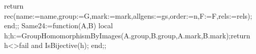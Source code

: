 \documentclass[
  10pt,
  letterpaper,
]{article}
\newenvironment{Shaded}{}{}
\newcommand{\BuiltInTok}[1]{\textcolor[rgb]{0.00,0.50,0.00}{#1}}
\newcommand{\ConstantTok}[1]{\textcolor[rgb]{0.53,0.00,0.00}{#1}}
\newcommand{\ExtensionTok}[1]{#1}
\newcommand{\FunctionTok}[1]{\textcolor[rgb]{0.02,0.16,0.49}{#1}}
\newcommand{\NormalTok}[1]{#1}
\newcommand{\OperatorTok}[1]{\textcolor[rgb]{0.40,0.40,0.40}{#1}}
\newcommand{\VariableTok}[1]{\textcolor[rgb]{0.10,0.09,0.49}{#1}}
\begin{document}
\begin{Shaded}
\begin{Highlighting}[]
 \ExtensionTok{return} \ExtensionTok{rec}\NormalTok{(}\VariableTok{name}\OperatorTok{:=}\VariableTok{name}\OperatorTok{,}\VariableTok{group}\OperatorTok{:=}\VariableTok{G}\OperatorTok{,}\VariableTok{mark}\OperatorTok{:=}\VariableTok{mark}\OperatorTok{,}\VariableTok{allgens}\OperatorTok{:=}\VariableTok{gs}\OperatorTok{,}\VariableTok{order}\OperatorTok{:=}\VariableTok{n}\OperatorTok{,}\VariableTok{F}\OperatorTok{:=}\VariableTok{F}\OperatorTok{,}\VariableTok{rels}\OperatorTok{:=}\VariableTok{rels}\NormalTok{)}\OperatorTok{;}
\FunctionTok{end}\OperatorTok{;;}
\VariableTok{Same24}\OperatorTok{:=}\FunctionTok{function}\NormalTok{(}\VariableTok{A}\OperatorTok{,}\VariableTok{B}\NormalTok{)}
 \ExtensionTok{local} \VariableTok{h}\OperatorTok{;}\VariableTok{h}\OperatorTok{:=}\BuiltInTok{GroupHomomorphismByImages}\NormalTok{(}\VariableTok{A}\NormalTok{.}\VariableTok{group}\OperatorTok{,}\VariableTok{B}\NormalTok{.}\VariableTok{group}\OperatorTok{,}\VariableTok{A}\NormalTok{.}\VariableTok{mark}\OperatorTok{,}\VariableTok{B}\NormalTok{.}\VariableTok{mark}\NormalTok{)}\OperatorTok{;}\ExtensionTok{return} \VariableTok{h}\OperatorTok{\textless{}\textgreater{}}\ConstantTok{fail} \ConstantTok{and} \BuiltInTok{IsBijective}\NormalTok{(}\VariableTok{h}\NormalTok{)}\OperatorTok{;}
\FunctionTok{end}\OperatorTok{;;}


\end{Highlighting}
\end{Shaded}
\end{document}
